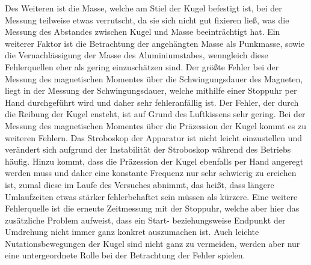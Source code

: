 Des Weiteren ist die Masse, welche am Stiel der Kugel befestigt ist, bei der Messung teilweise etwas verrutscht, da sie sich nicht
gut fixieren ließ, was die Messung des Abstandes zwischen Kugel und Masse beeinträchtigt hat. Ein weiterer Faktor ist die Betrachtung
der angehängten Masse als Punkmasse, sowie die Vernachlässigung der Masse des Aluminiumstabes, wenngleich diese Fehlerquellen eher 
als gering einzuschätzen sind.
Der größte Fehler bei der Messung des magnetischen Momentes über die Schwingungsdauer des Magneten, liegt in der Messung der 
Schwingungsdauer, welche mithilfe einer Stoppuhr per Hand durchgeführt wird und daher sehr fehleranfällig ist.
Der Fehler, der durch die Reibung der Kugel ensteht, ist auf Grund des Luftkissens sehr gering.
Bei der Messung des magnetischen Momentes über die Präzession der Kugel kommt es zu weiteren Fehlern. Das Stroboskop der 
Apparatur ist nicht leicht einzustellen und verändert sich aufgrund der Instabilität der Stroboskop während des Betriebs häufig.
Hinzu kommt, dass die Präzession der Kugel ebenfalls per Hand angeregt werden muss und daher eine konstante Frequenz nur sehr
schwierig zu ereichen ist, zumal diese im Laufe des Versuches abnimmt, das heißt, dass längere Umlaufzeiten etwas stärker 
fehlerbehaftet sein müssen als kürzere. Eine weitere Fehlerquelle ist die erneute Zeitmessung mit der Stoppuhr, welche aber hier
das zusätzliche Problem aufweist, dass ein Start- beziehungsweise Endpunkt der Umdrehung nicht immer ganz konkret auszumachen ist.
Auch leichte Nutationsbewegungen der Kugel sind nicht ganz zu vermeiden, werden aber nur eine untergeordnete Rolle bei der Betrachtung
der Fehler spielen.